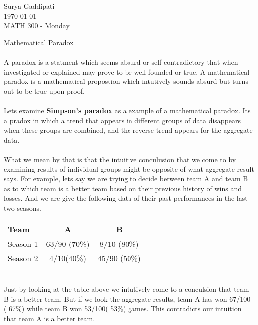 \documentclass[12pt]{article}
\begin{document}
 

Surya Gaddipati\\
\today\\
MATH 300 - Monday
\begin{center}
Mathematical Paradox
\end{center}
\paragraph{}
A paradox is a statment which seems absurd or self-contradictory that when investigated or explained may prove to be well founded or true. A mathematical paradox is a mathematical propostion which intutively sounds absurd but turns out to be true upon proof.
\paragraph{}
 Lets examine \textbf{Simpson's paradox} as a example of a mathematical paradox.  Its a pradox in which a trend that appears in different groups of data disappears when these groups are combined, and the reverse trend appears for the aggregate data. 
 \paragraph{}
 What we mean by that is that the intuitive conculusion that we come to by examining results of individual groups might be opposite of what aggregate result says.
 For example, lets say we are trying to decide between team A and team B as to which team is a better team  based on their previous history of wins and losses. And we are give the following data of their past performances in the last two seasons.
 \\
 \begin{tabular}{l*{2}{c}r}
   Team              & A & B \\
   \hline
    Season 1 & 63/90 (70\%) & 8/10 (80\%)  \\
   Season 2  & 4/10(40\%) & 45/90 (50\%)   \\
 \end{tabular}
 \\
 Just by looking at the table above we intutively come to a conculsion that team B is a better team. But if we look the aggregate results, team A has won 67/100 ( 67\%) while team B won 53/100( 53\%) games. This contradicts our intuition that team A is a better team.
\end{document}
